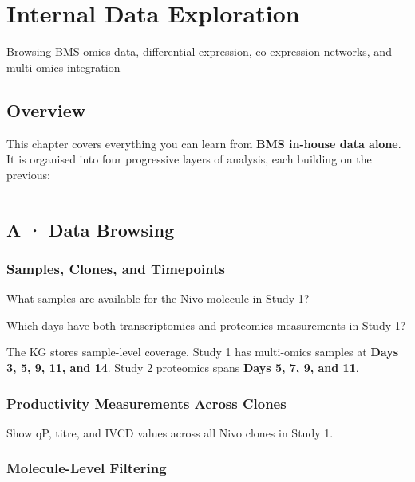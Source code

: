 \documentclass[
  letterpaper,
  oneside,
  open=any]{scrbook}
\begin{document}

\chapter{Internal Data Exploration}\label{internal-data-exploration}

Browsing BMS omics data, differential expression, co-expression
networks, and multi-omics integration

\hfill\break

\section{Overview}\label{sec-internal}

This chapter covers everything you can learn from \textbf{BMS in-house
data alone}. It is organised into four progressive layers of analysis,
each building on the previous:

\begin{center}\rule{0.5\linewidth}{0.5pt}\end{center}

\section{A · Data Browsing}\label{sec-browsing}

\subsection{Samples, Clones, and
Timepoints}\label{samples-clones-and-timepoints}

What samples are available for the Nivo molecule in Study 1?

Which days have both transcriptomics and proteomics measurements in
Study 1?

The KG stores sample-level coverage. Study 1 has multi-omics samples at
\textbf{Days 3, 5, 9, 11, and 14}. Study 2 proteomics spans \textbf{Days
5, 7, 9, and 11}.

\subsection{Productivity Measurements Across
Clones}\label{productivity-measurements-across-clones}

Show qP, titre, and IVCD values across all Nivo clones in Study 1.

\subsection{Molecule-Level Filtering}\label{molecule-level-filtering}
\end{document}
